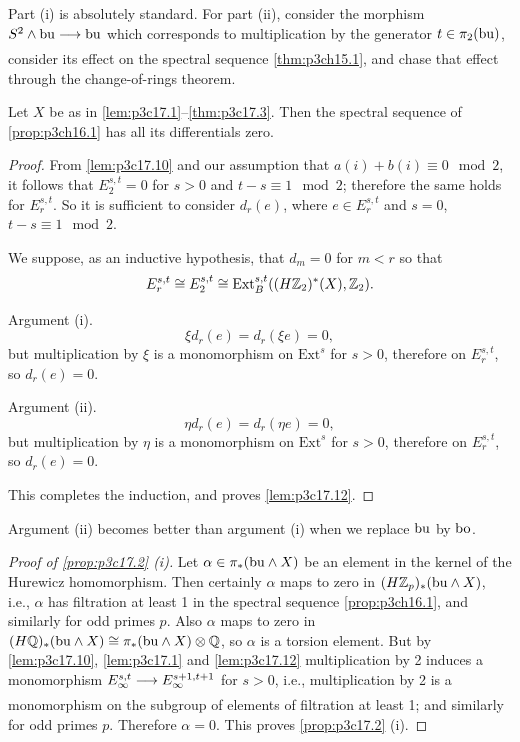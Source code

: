 \documentclass[../main]{subfiles}
\begin{document}
Part (i) is absolutely standard. For part (ii), consider the morphism $S^2\wedge\te{bu}\lar{}\te{bu}$ which corresponds to multiplication by the generator $t\in\pi_2(\mathrm{bu})$, consider its effect on the spectral sequence \ref{thm:p3ch15.1}, and chase that effect through the change-of-rings theorem.

\begin{lemma}
\label{lem:p3c17.12} 
Let $X$ be as in \ref{lem:p3c17.1}--\ref{thm:p3c17.3}. Then the spectral sequence of \ref{prop:p3ch16.1} has all its differentials zero. 
\end{lemma}

\begin{proof}
From \ref{lem:p3c17.10} and our assumption that $a(i) + b(i) \equiv 0 \mod 2$, it follows that $E_2^{s, t} = 0$ for $s > 0$ and $t - s \equiv 1 \mod 2$; therefore the same holds for $E_r^{s, t}$. So it is sufficient to consider $d_r(e)$, where $e \in E_r^{s, t}$ and $s = 0$, $t - s \equiv 1 \mod 2$. 

We suppose, as an inductive hypothesis, that $d_m=0$ for $m<r$ so that \[E_r^{s,t}\cong E_2^{s,t}\cong\mathrm{Ext}_B^{s,t}((H\mathbb{Z}_2)^\ast(X),\mathbb{Z}_2).\]

Argument (i). \[\xi d_r(e) = d_r(\xi e) = 0,\] but multiplication by $\xi$ is a monomorphism on $\mathrm{Ext}^s$ for $s > 0$, therefore on $E_r^{s, t}$, so $d_r(e) = 0$.

Argument (ii). \[\eta d_r(e) = d_r(\eta e) = 0,\] but multiplication by $\eta$ is a monomorphism on $\mathrm{Ext}^s$ for $s > 0$, therefore on $E_r^{s, t}$, so $d_r(e) = 0$.

This completes the induction, and proves \ref{lem:p3c17.12}. 
\end{proof}

\begin{remark*}
Argument (ii) becomes better than argument (i) when we replace $\mathrm{bu}$ by $\mathrm{bo}$. 
\end{remark*} 

\begin{proof}[Proof of \ref{prop:p3c17.2} (i)]
Let $\alpha \in \pi_\ast(\mathrm{bu} \wedge X)$ be an element in the kernel of the Hurewicz homomorphism. Then certainly $\alpha$ maps to zero in $(H \mathbb{Z}_p)_\ast(\mathrm{bu} \wedge X)$, i.e., $\alpha$ has filtration at least 1 in the spectral sequence \ref{prop:p3ch16.1}, and similarly for odd primes $p$. Also $\alpha$ maps to zero in $(H \mathbb{Q})_\ast(\mathrm{bu} \wedge X) \cong \pi_\ast(\mathrm{bu} \wedge X) \otimes \mathbb{Q}$, so $\alpha$ is a torsion element. But by \ref{lem:p3c17.10}, \ref{lem:p3c17.1} and \ref{lem:p3c17.12} multiplication by 2 induces a monomorphism $E_\infty^{s, t} \lar{} E_\infty^{s + 1, t + 1}$ for $s > 0$, i.e., multiplication by 2 is a monomorphism on the subgroup of elements of filtration at least 1; and similarly for odd primes $p$. Therefore $\alpha = 0$. This proves \ref{prop:p3c17.2} (i).
\end{proof}
\end{document}
